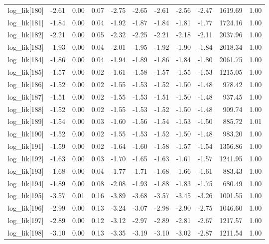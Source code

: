 \begin{table}[ht]
\begin{tabular}{rrrrrrrrrrr}
  log\_lik[180] & -2.61 & 0.00 & 0.07 & -2.75 & -2.65 & -2.61 & -2.56 & -2.47 & 1619.69 & 1.00 \\ 
  log\_lik[181] & -1.84 & 0.00 & 0.04 & -1.92 & -1.87 & -1.84 & -1.81 & -1.77 & 1724.16 & 1.00 \\ 
  log\_lik[182] & -2.21 & 0.00 & 0.05 & -2.32 & -2.25 & -2.21 & -2.18 & -2.11 & 2037.96 & 1.00 \\ 
  log\_lik[183] & -1.93 & 0.00 & 0.04 & -2.01 & -1.95 & -1.92 & -1.90 & -1.84 & 2018.34 & 1.00 \\ 
  log\_lik[184] & -1.86 & 0.00 & 0.04 & -1.94 & -1.89 & -1.86 & -1.84 & -1.80 & 2061.75 & 1.00 \\ 
  log\_lik[185] & -1.57 & 0.00 & 0.02 & -1.61 & -1.58 & -1.57 & -1.55 & -1.53 & 1215.05 & 1.00 \\ 
  log\_lik[186] & -1.52 & 0.00 & 0.02 & -1.55 & -1.53 & -1.52 & -1.50 & -1.48 & 978.42 & 1.00 \\ 
  log\_lik[187] & -1.51 & 0.00 & 0.02 & -1.55 & -1.53 & -1.51 & -1.50 & -1.48 & 937.45 & 1.00 \\ 
  log\_lik[188] & -1.52 & 0.00 & 0.02 & -1.55 & -1.53 & -1.52 & -1.50 & -1.48 & 909.74 & 1.00 \\ 
  log\_lik[189] & -1.54 & 0.00 & 0.03 & -1.60 & -1.56 & -1.54 & -1.53 & -1.50 & 885.72 & 1.01 \\ 
  log\_lik[190] & -1.52 & 0.00 & 0.02 & -1.55 & -1.53 & -1.52 & -1.50 & -1.48 & 983.20 & 1.00 \\ 
  log\_lik[191] & -1.59 & 0.00 & 0.02 & -1.64 & -1.60 & -1.58 & -1.57 & -1.54 & 1356.86 & 1.00 \\ 
  log\_lik[192] & -1.63 & 0.00 & 0.03 & -1.70 & -1.65 & -1.63 & -1.61 & -1.57 & 1241.95 & 1.00 \\ 
  log\_lik[193] & -1.68 & 0.00 & 0.04 & -1.77 & -1.71 & -1.68 & -1.66 & -1.61 & 883.43 & 1.00 \\ 
  log\_lik[194] & -1.89 & 0.00 & 0.08 & -2.08 & -1.93 & -1.88 & -1.83 & -1.75 & 680.49 & 1.00 \\ 
  log\_lik[195] & -3.57 & 0.01 & 0.16 & -3.89 & -3.68 & -3.57 & -3.45 & -3.26 & 1001.55 & 1.00 \\ 
  log\_lik[196] & -2.99 & 0.00 & 0.13 & -3.24 & -3.07 & -2.98 & -2.90 & -2.75 & 1046.60 & 1.00 \\ 
  log\_lik[197] & -2.89 & 0.00 & 0.12 & -3.12 & -2.97 & -2.89 & -2.81 & -2.67 & 1217.57 & 1.00 \\ 
  log\_lik[198] & -3.10 & 0.00 & 0.13 & -3.35 & -3.19 & -3.10 & -3.02 & -2.87 & 1211.54 & 1.00 \\ 

\end{tabular}
\end{table}
